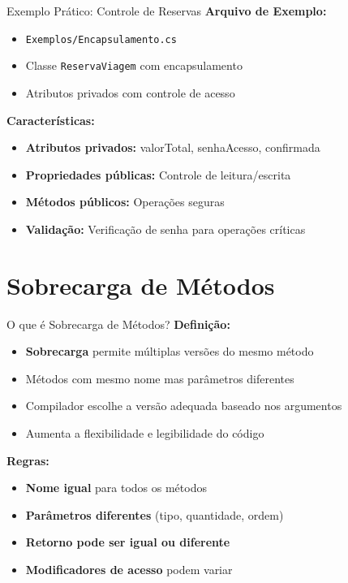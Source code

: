 \documentclass[aspectratio=169]{beamer}
\begin{document}
\begin{frame}{Exemplo Prático: Controle de Reservas}
\textbf{Arquivo de Exemplo:}
\begin{itemize}
    \item \texttt{Exemplos/Encapsulamento.cs}
    \item Classe \texttt{ReservaViagem} com encapsulamento
    \item Atributos privados com controle de acesso
\end{itemize}

\textbf{Características:}
\begin{itemize}
    \item \textbf{Atributos privados:} valorTotal, senhaAcesso, confirmada
    \item \textbf{Propriedades públicas:} Controle de leitura/escrita
    \item \textbf{Métodos públicos:} Operações seguras
    \item \textbf{Validação:} Verificação de senha para operações críticas
\end{itemize}
\end{frame}

\section{Sobrecarga de Métodos}

\begin{frame}{O que é Sobrecarga de Métodos?}
\textbf{Definição:}
\begin{itemize}
    \item \textbf{Sobrecarga} permite múltiplas versões do mesmo método
    \item Métodos com mesmo nome mas parâmetros diferentes
    \item Compilador escolhe a versão adequada baseado nos argumentos
    \item Aumenta a flexibilidade e legibilidade do código
\end{itemize}

\textbf{Regras:}
\begin{itemize}
    \item \textbf{Nome igual} para todos os métodos
    \item \textbf{Parâmetros diferentes} (tipo, quantidade, ordem)
    \item \textbf{Retorno pode ser igual ou diferente}
    \item \textbf{Modificadores de acesso} podem variar
\end{itemize}
\end{frame}
\end{document}

